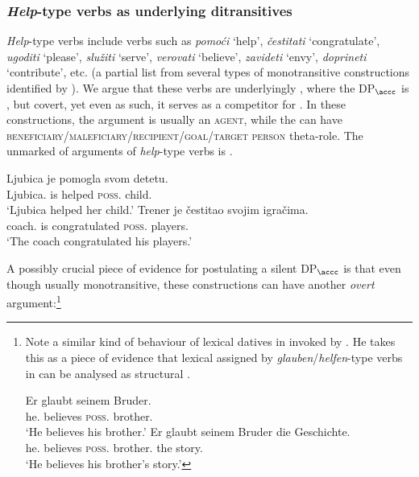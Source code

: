 \documentclass[output=paper,modfonts,newtxmath,hidelinks]{langscibook}
\begin{document}
\subsubsection{\textit{Help}-type verbs as underlying ditransitives}

\textit{Help}-type verbs include verbs such as \textit{pomoći} `help', \textit{čestitati} `congratulate', \textit{ugodi\-ti} `please', \textit{služiti} `serve', \textit{verovati} `believe', \textit{zavideti} `envy', \textit{doprineti} `contribute', etc. (a partial list from several types of monotransitive  constructions identified by \citealt{stipcevic}). We argue that these verbs are underlyingly , where the  DP$_{\accc}$ is , but covert, yet even as such, it serves as a competitor for  . In these constructions, the \nomm{} argument is usually an \textsc{agent}, while the \datt{} can have \textsc{be\-ne\-fi\-ciary}/\textsc{male\-fi\-ciary}/\textsc{re\-ci\-pi\-ent}/\textsc{goal}/\textsc{tar\-get person} theta-role. The unmarked  of arguments of \textit{help}-type verbs is \nomm{} \before{} \datt{} .

\ea\label{16:ex26}
\ea\gll Ljubica je pomogla svom detetu.\\
Ljubica.\nomm{} is helped \textsc{poss}.\datt{} child.\datt\\
\glt `Ljubica helped her child.'
\ex\gll Trener je  čestitao svojim igračima.\\
coach.\nomm{} is congratulated \textsc{poss}.\datt{} players.\datt\\
\glt `The coach congratulated his players.'
\z \z

\noindent A possibly crucial piece of evidence for postulating a silent DP$_{\accc}$ is that even though usually monotransitive, these constructions can have another \textit{overt} \accc{} argument:\footnote{Note a similar kind of behaviour of lexical datives in  invoked by \citep[129]{mcfadden04}. He takes this as a piece of evidence that lexical  assigned by \textit{glauben}/\textit{helfen}-type verbs in  can be analysed as structural .
	
	\ea
	\ea\gll Er glaubt seinem Bruder.\\
	he.\nomm{} believes \textsc{poss}.\datt{} brother.\datt\\
	\glt `He believes his brother.'
	\ex\gll Er glaubt seinem Bruder die Geschichte.\\
	he.\nomm{} believes \textsc{poss}.\datt{} brother.\datt{} the story.\accc\\
	\glt `He believes his brother's story.'
    \z \z
	
	
}
\end{document}
